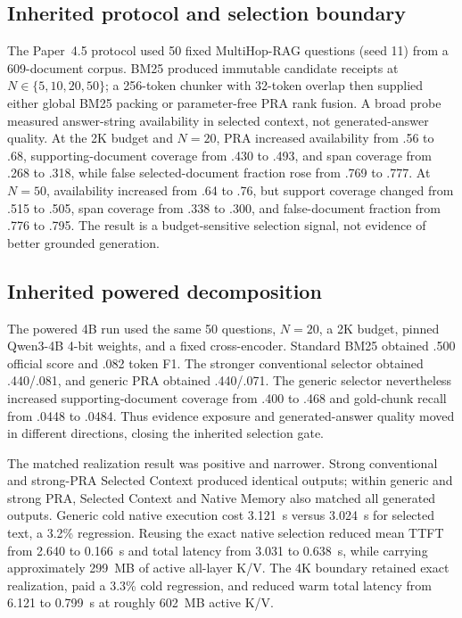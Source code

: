 \documentclass[11pt]{article}
\begin{document}
\subsection{Inherited protocol and selection boundary}
The Paper~4.5 protocol used 50 fixed MultiHop-RAG questions (seed 11) from a
609-document corpus. BM25 produced immutable candidate receipts at
$N\in\{5,10,20,50\}$; a 256-token chunker with 32-token overlap then supplied
either global BM25 packing or parameter-free PRA rank fusion. A broad probe
measured answer-string availability in selected context, not generated-answer
quality. At the 2K budget and $N=20$, PRA increased availability from .56 to
.68, supporting-document coverage from .430 to .493, and span coverage from
.268 to .318, while false selected-document fraction rose from .769 to .777.
At $N=50$, availability increased from .64 to .76, but support coverage changed
from .515 to .505, span coverage from .338 to .300, and false-document fraction
from .776 to .795. The result is a budget-sensitive selection signal, not
evidence of better grounded generation.

\subsection{Inherited powered decomposition}
The powered 4B run used the same 50 questions, $N=20$, a 2K budget, pinned
Qwen3-4B 4-bit weights, and a fixed cross-encoder. Standard BM25 obtained .500
official score and .082 token F1. The stronger conventional selector obtained
.440/.081, and generic PRA obtained .440/.071. The generic selector nevertheless
increased supporting-document coverage from .400 to .468 and gold-chunk recall
from .0448 to .0484. Thus evidence exposure and generated-answer quality moved
in different directions, closing the inherited selection gate.

The matched realization result was positive and narrower. Strong conventional
and strong-PRA Selected Context produced identical outputs; within generic and
strong PRA, Selected Context and Native Memory also matched all generated
outputs. Generic cold native execution cost 3.121~s versus 3.024~s for selected
text, a 3.2\% regression. Reusing the exact native selection reduced mean TTFT
from 2.640 to 0.166~s and total latency from 3.031 to 0.638~s, while carrying
approximately 299~MB of active all-layer K/V. The 4K boundary retained exact
realization, paid a 3.3\% cold regression, and reduced warm total latency from
6.121 to 0.799~s at roughly 602~MB active K/V.
\end{document}
